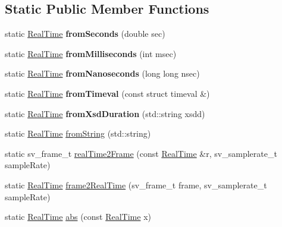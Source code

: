 \subsection*{Static Public Member Functions}
\begin{DoxyCompactItemize}
\item 
\mbox{\label{struct_real_time_af77338efa3ad12743a8055dbe18b0db9}} 
static \hyperlink{struct_real_time}{Real\+Time} {\bfseries from\+Seconds} (double sec)
\item 
\mbox{\label{struct_real_time_ad531941c58f834ba5b44c3a8861a35c8}} 
static \hyperlink{struct_real_time}{Real\+Time} {\bfseries from\+Milliseconds} (int msec)
\item 
\mbox{\label{struct_real_time_ad2f1ce9ce7804dac70776c2f5379e041}} 
static \hyperlink{struct_real_time}{Real\+Time} {\bfseries from\+Nanoseconds} (long long nsec)
\item 
\mbox{\label{struct_real_time_acf6e534f92fe820e1c9bf724296189be}} 
static \hyperlink{struct_real_time}{Real\+Time} {\bfseries from\+Timeval} (const struct timeval \&)
\item 
\mbox{\label{struct_real_time_a077463b388e2d951aaffbf521731db25}} 
static \hyperlink{struct_real_time}{Real\+Time} {\bfseries from\+Xsd\+Duration} (std\+::string xsdd)
\item 
static \hyperlink{struct_real_time}{Real\+Time} \hyperlink{struct_real_time_a1de34971af5a8f2f5c7e54566f4e42f4}{from\+String} (std\+::string)
\item 
static sv\+\_\+frame\+\_\+t \hyperlink{struct_real_time_a3a99b7b0da96694a868e8fc211c41375}{real\+Time2\+Frame} (const \hyperlink{struct_real_time}{Real\+Time} \&r, sv\+\_\+samplerate\+\_\+t sample\+Rate)
\item 
static \hyperlink{struct_real_time}{Real\+Time} \hyperlink{struct_real_time_a4d53e4b8dc9693d158f5ad9165def079}{frame2\+Real\+Time} (sv\+\_\+frame\+\_\+t frame, sv\+\_\+samplerate\+\_\+t sample\+Rate)
\item 
static \hyperlink{struct_real_time}{Real\+Time} \hyperlink{struct_real_time_af5b87bca9dc8905e27f5b9c2669dcdb8}{abs} (const \hyperlink{struct_real_time}{Real\+Time} x)
\end{DoxyCompactItemize}
